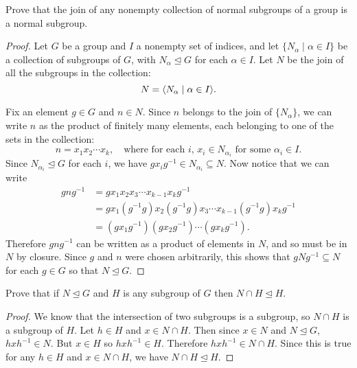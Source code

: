  Prove that the join of any nonempty collection of normal
subgroups of a group is a normal subgroup.
\begin{proof}
  Let $G$ be a group and $I$ a nonempty set of indices, and let
  $\{N_\alpha\mid\alpha\in I\}$ be a collection of subgroups of $G$,
  with $N_\alpha\trianglelefteq G$ for each $\alpha\in I$. Let $N$ be
  the join of all the subgroups in the collection:
  \begin{equation*}
    N = \langle{N_\alpha \mid \alpha\in I}\rangle.
  \end{equation*}

  Fix an element $g\in G$ and $n\in N$. Since $n$ belongs to the join
  of $\{N_\alpha\}$, we can write $n$ as the product of finitely many
  elements, each belonging to one of the sets in the collection:
  \begin{equation*}
    n = x_1x_2\cdots x_k,
    \quad\text{where for each $i$,
      $x_i\in N_{\alpha_i}$ for some $\alpha_i\in I$}.
  \end{equation*}
  Since $N_{\alpha_i}\trianglelefteq G$ for each $i$, we have
  $gx_ig^{-1}\in N_{\alpha_i}\subseteq N$. Now notice that we can
  write
  \begin{align*}
    gng^{-1}
    &= gx_1x_2x_3\cdots x_{k-1}x_kg^{-1} \\
    &= gx_1(g^{-1}g)x_2(g^{-1}g)x_3\cdots x_{k-1}(g^{-1}g)x_kg^{-1} \\
    &= (gx_1g^{-1})(gx_2g^{-1})\cdots(gx_kg^{-1}).
  \end{align*}
  Therefore $gng^{-1}$ can be written as a product of elements in $N$,
  and so must be in $N$ by closure. Since $g$ and $n$ were chosen
  arbitrarily, this shows that $gNg^{-1}\subseteq N$ for each $g\in G$
  so that $N\trianglelefteq G$.
\end{proof}

\label{exercise:quotient-group:normal-intersect-subgroup-is-normal}
Prove that if $N\trianglelefteq G$ and $H$ is any subgroup of $G$ then
$N\cap H\trianglelefteq H$.
\begin{proof}
  We know that the intersection of two subgroups is a subgroup, so
  $N\cap H$ is a subgroup of $H$. Let $h\in H$ and $x\in N\cap
  H$. Then since $x\in N$ and $N\trianglelefteq G$, $hxh^{-1}\in
  N$. But $x\in H$ so $hxh^{-1}\in H$. Therefore
  $hxh^{-1}\in N\cap H$. Since this is true for any $h\in H$ and
  $x\in N\cap H$, we have $N\cap H\trianglelefteq H$.
\end{proof}

